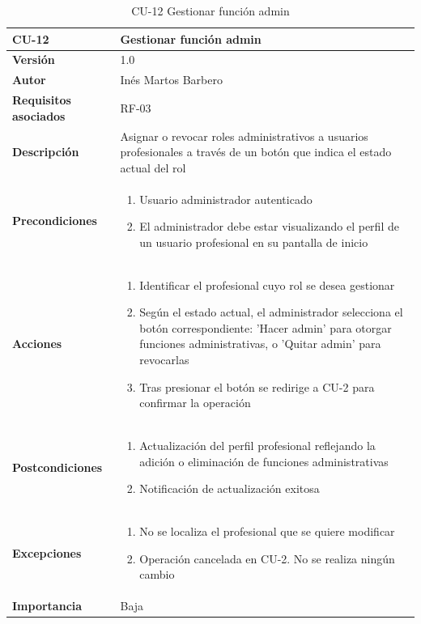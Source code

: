 \begin{table}[p]
	\centering
	\begin{tabularx}{\linewidth}{ p{} p{} }
		\toprule
		\textbf{CU-12}    & \textbf{Gestionar función admin}\\
		\toprule
		\textbf{Versión}              & 1.0    \\
		\textbf{Autor}                & Inés Martos Barbero \\
		\textbf{Requisitos asociados} & RF-03 \\
		\textbf{Descripción}          & Asignar o revocar roles administrativos a usuarios profesionales a través de un botón que indica el estado actual del rol \\
		\textbf{Precondiciones}         & 
            \begin{enumerate}
    			\def\labelenumi{\arabic{enumi}.}
    			\tightlist
    			\item Usuario administrador autenticado
    			\item El administrador debe estar visualizando el perfil de un usuario profesional en su pantalla de inicio
		  \end{enumerate}\\
		\textbf{Acciones}             &
		\begin{enumerate}
			\def\labelenumi{\arabic{enumi}.}
			\tightlist
			\item Identificar el profesional cuyo rol se desea gestionar
			\item Según el estado actual, el administrador selecciona el botón correspondiente: 'Hacer admin' para otorgar funciones administrativas, o 'Quitar admin' para revocarlas
            \item Tras presionar el botón se redirige a CU-2 para confirmar la operación
		\end{enumerate}\\
		\textbf{Postcondiciones}        & 
            \begin{enumerate}
    			\def\labelenumi{\arabic{enumi}.}
    			\tightlist
    			\item Actualización del perfil profesional reflejando la adición o eliminación de funciones administrativas
    			\item Notificación de actualización exitosa
		  \end{enumerate}\\
		\textbf{Excepciones}          & 
            \begin{enumerate}
    			\def\labelenumi{\arabic{enumi}.}
    			\tightlist
    			\item No se localiza el profesional que se quiere modificar
    			\item Operación cancelada en CU-2. No se realiza ningún cambio
		  \end{enumerate}\\
		\textbf{Importancia}          & Baja \\
		\bottomrule
	\end{tabularx}
	\caption{CU-12 Gestionar función admin}
    \label{CU-12}
\end{table}

